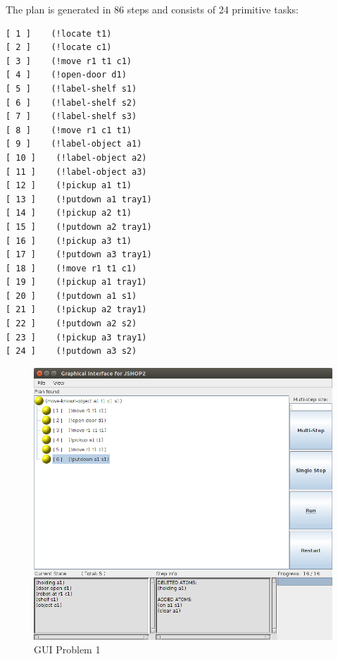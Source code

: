 \documentclass[paper=a4, fontsize=11pt]{scrartcl}
\begin{document}
	\vspace{5mm}
	
	The plan is generated in 86 steps and consists of 24 primitive tasks: \\
	
\begin{lstlisting}
[ 1 ]    (!locate t1)
[ 2 ]    (!locate c1)
[ 3 ]    (!move r1 t1 c1)
[ 4 ]    (!open-door d1)
[ 5 ]    (!label-shelf s1)
[ 6 ]    (!label-shelf s2)
[ 7 ]    (!label-shelf s3)
[ 8 ]    (!move r1 c1 t1)
[ 9 ]    (!label-object a1)
[ 10 ]    (!label-object a2)
[ 11 ]    (!label-object a3)
[ 12 ]    (!pickup a1 t1)
[ 13 ]    (!putdown a1 tray1)
[ 14 ]    (!pickup a2 t1)
[ 15 ]    (!putdown a2 tray1)
[ 16 ]    (!pickup a3 t1)
[ 17 ]    (!putdown a3 tray1)
[ 18 ]    (!move r1 t1 c1)
[ 19 ]    (!pickup a1 tray1)
[ 20 ]    (!putdown a1 s1)
[ 21 ]    (!pickup a2 tray1)
[ 22 ]    (!putdown a2 s2)
[ 23 ]    (!pickup a3 tray1)
[ 24 ]    (!putdown a3 s2)
\end{lstlisting}

	
	\begin{figure}[h!]
		\centering
		\includegraphics[width=1\linewidth]{images/problem1_gui}
		\caption{GUI Problem 1 }
		\label{fig:probem1_gui}
	\end{figure}
		
\end{document}

